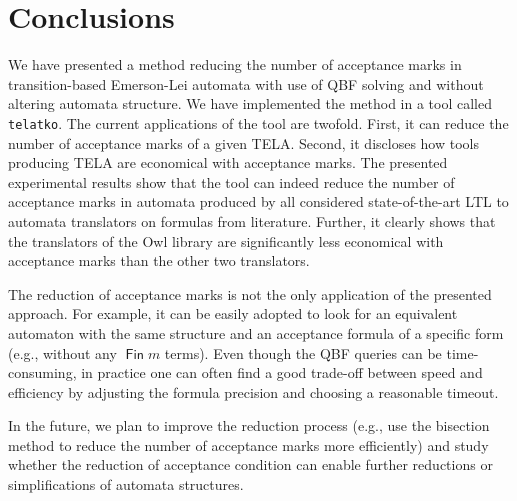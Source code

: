 \documentclass[runningheads]{llncs}
\DeclareMathOperator{\Fin}{\mathsf{Fin}}
\begin{document}

\section{Conclusions}\label{sec:conclusion}

We have presented a method reducing the number of acceptance marks in
transition-based Emerson-Lei automata with use of QBF solving and
without altering automata structure. We have implemented the method in
a tool called \texttt{telatko}. The current applications of the tool
are twofold. First, it can reduce the number of acceptance marks of a
given TELA. Second, it discloses how tools producing TELA are
economical with acceptance marks. The presented experimental results
show that the tool can indeed reduce the number of acceptance marks in
automata produced by all considered state-of-the-art LTL to automata
translators on formulas from literature. Further, it clearly shows
that the translators of the Owl library are significantly less
economical with acceptance marks than the other two translators.

The reduction of acceptance marks is not the only application of the
presented approach. For example, it can be easily adopted to look for
an equivalent automaton with the same structure and an acceptance
formula of a specific form (e.g., without any $\Fin m$ terms). Even
though the QBF queries can be time-consuming, in practice one can
often find a good trade-off between speed and efficiency by adjusting 
the formula precision and choosing a reasonable timeout.

In the future, we plan to improve the reduction process (e.g., use the
bisection method to reduce the number of acceptance marks more
efficiently) and study whether the reduction of acceptance condition
can enable further reductions or simplifications of automata
structures.






%

\end{document}
